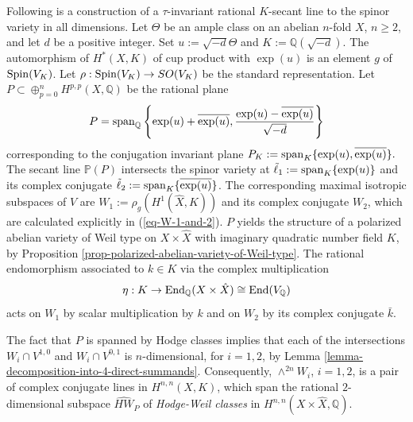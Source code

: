 \documentclass[12pt]{amsart}
\numberwithin{equation}{subsection}
\theoremstyle{plain}
\theoremstyle{definition}
\newcommand{\QQ}{{\mathbb Q}}
\newcommand{\PP}{{\mathbb P}}
\newcommand{\Spin}{{\rm Spin}}
\newcommand{\End}{{\rm End}}
\renewcommand{\span}{{\rm span}}
\begin{document}
Following is a construction of a $\tau$-invariant rational $K$-secant line to the spinor variety in all dimensions.
Let  $\Theta$ be an ample class on an abelian $n$-fold $X$, $n\geq 2$, 
and let $d$ be a positive integer. Set $u:=\sqrt{-d}\Theta$ and $K:=\QQ(\sqrt{-d})$. The automorphism of $H^*(X,K)$ of cup product with $\exp(u)$ is an element $g$ of $\Spin(V_K)$. Let $\rho:\Spin(V_K)\rightarrow SO(V_K)$ be the standard representation. 
Let $P\subset \oplus_{p=0}^nH^{p,p}(X,\QQ)$ be the rational plane 
\begin{equation}
\label{eq-P-introduction}
P=\span_\QQ\left\{\exp(u)+\overline{\exp(u)},\frac{\exp(u)-\overline{\exp(u)}}{\sqrt{-d}}\right\}
\end{equation}
corresponding to the conjugation invariant plane 
$P_K:=\span_K\{\exp(u),\overline{\exp(u)}\}.$
The secant line $\PP(P)$ intersects the spinor variety at $\tilde{\ell}_1:=\span_K\{\exp(u)\}$ and its complex conjugate $\tilde{\ell}_2:=\span_K\{\overline{\exp(u)}\}$. 
The corresponding maximal isotropic subspaces of $V$ are $W_1:=\rho_g(H^1(\hat{X},K))$ and its complex conjugate $W_2$, which are calculated explicitly in (\ref{eq-W-1-and-2}).
$P$  yields the structure of a polarized abelian variety of Weil type on $X\times \hat{X}$ with imaginary quadratic number field $K$, by Proposition \ref{prop-polarized-abelian-variety-of-Weil-type}. 
The rational endomorphism associated to $k\in K$ via the complex multiplication
\[
\eta:K\rightarrow \End_\QQ(X\times\hat{X})\cong \End(V_\QQ)
\]
acts on $W_1$ by scalar multiplication by $k$ and on $W_2$ by its complex conjugate $\bar{k}$.

The fact that $P$ is spanned by Hodge classes implies that each of the intersections $W_i\cap V^{1,0}$ and $W_i\cap V^{0,1}$ is $n$-dimensional, for $i=1,2$, by
Lemma \ref{lemma-decomposition-into-4-direct-summands}. 
Consequently, $\wedge^{2n}W_i$, $i=1,2$, is a pair of complex conjugate lines in $H^{n,n}(X,K)$, which span the rational $2$-dimensional subspace  $\hat{HW}_P$ 
of {\em Hodge-Weil classes} in $H^{n,n}(X\times\hat{X},\QQ)$. 
\end{document}
